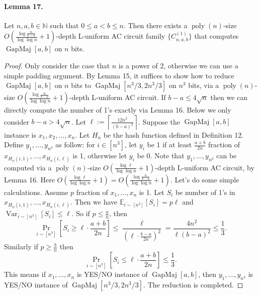 \documentclass[10pt,a4paper]{article}
\begin{document}
\paragraph{Lemma 17.} Let $n,a,b\in\mathbb N$ such that $0\le a<b\le n$. Then there exists a $\operatorname{poly}(n)$-size $O\left(\frac{\log\frac n{b-a}}{\log\log n}+1\right)$-depth L-uniform AC circuit family $\{C_{n,a,b}^{(1)}\}$ that computes $\operatorname{GapMaj}[a,b]$ on $n$ bits.
\begin{proof}
Only consider the case that $n$ is a power of 2, otherwise we can use a simple padding argument. By Lemma 15, it suffices to show how to reduce $\operatorname{GapMaj}[a,b]$ on $n$ bits to $\operatorname{GapMaj}[n^3/3,2n^3/3]$ on $n^3$ bits, via a $\operatorname{poly}(n)$-size $O\left(\frac{\log\frac n{b-a}}{\log\log n}+1\right)$-depth L-uniform AC circuit.
If $b-a\le4\sqrt n$ then we can directly compute the number of 1's exactly via Lemma 16. Below we only consider $b-a>4\sqrt n$.
Let $\ell:=\left\lceil\frac{12n^2}{(b-a)^2}\right\rceil$. Suppose the $\operatorname{GapMaj}[a,b]$ instance is $x_1,x_2,\ldots,x_n$. Let $H_n$ be the hash function defined in Definition 12. Define $y_1,\ldots,y_{n^3}$ as follow: for $i\in[n^3]$, let $y_i$ be 1 if at least $\frac{a+b}{2n}$ fraction of $x_{H_n(i,1)},\ldots,x_{H_n(i,\ell)}$ is 1, otherwise let $y_i$ be 0. Note that $y_1,\ldots,y_{n^3}$ can be computed via a $\operatorname{poly}(n)$-size $O\left(\frac{\log\ell}{\log\log n}+1\right)$-depth L-uniform AC circuit, by Lemma 16. Here $O\left(\frac{\log\ell}{\log\log n}+1\right)=O\left(\frac{\log\frac n{b-a}}{\log\log n}+1\right)$.
Let's do some simple calculations. Assume $p$ fraction of $x_1,\ldots,x_n$ is 1. Let $S_i$ be number of 1's in $x_{H_n(i,1)},\ldots,x_{H_n(i,\ell)}$. Then we have $\mathbb E_{i\sim[n^3]}[S_i]=p\ell$ and $\operatorname{Var}_{i\sim[n^3]}[S_i]\le\ell$. So if $p\le\frac an$, then
\[\Pr_{i\sim[n^3]}\left[S_i\ge\ell\cdot\frac{a+b}{2n}\right]\le\frac\ell{(\ell\cdot\frac{b-a}{2n})^2}=\frac{4n^2}{\ell(b-a)^2}\le\frac13.\]
Similarly if $p\ge\frac bn$ then
\[\Pr_{i\sim[n^3]}\left[S_i\le\ell\cdot\frac{a+b}{2n}\right]\le\frac13.\]
This means if $x_1,\ldots,x_n$ is YES/NO instance of $\operatorname{GapMaj}[a,b]$, then $y_1,\ldots,y_{n^3}$ is YES/NO instance of $\operatorname{GapMaj}[n^3/3,2n^3/3]$. The reduction is completed.
\end{proof}
\end{document}
